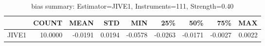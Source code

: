 \begin{table}[ht]
\centering
\caption{bias summary: Estimator=JIVE1, Instruments=111, Strength=0.40}
\begin{tabular}{lrrrrrrrr}
\toprule
 & COUNT & MEAN & STD & MIN & 25\% & 50\% & 75\% & MAX \\
\midrule
JIVE1 & 10.0000 & -0.0191 & 0.0194 & -0.0578 & -0.0263 & -0.0171 & -0.0027 & 0.0022 \\
\bottomrule
\end{tabular}
\end{table}
